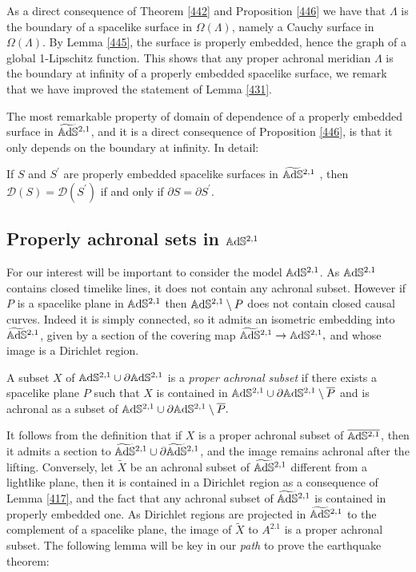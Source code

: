 \begin{observation}\label{447}
    As a direct consequence of Theorem \ref{442} and Proposition \ref{446} we have that $\Lambda$ is the boundary of a spacelike surface in $\Omega(\Lambda)$, namely a Cauchy surface in $\Omega(\Lambda)$. By Lemma \ref{445}, the surface is properly embedded, hence the graph of a global 1-Lipschitz function. This shows that any proper achronal meridian $\Lambda$ is the boundary at infinity of a properly embedded spacelike surface, we remark that we have improved the statement of Lemma \ref{431}.
\end{observation}

The most remarkable property of domain of dependence of a properly embedded surface in $\widetilde{\mathbb{A}\mathrm{d}\mathbb{S}}{}^{2,1}$, and it is a direct consequence of Proposition \ref{446}, is that it only depends on the boundary at infinity. In detail:

\begin{corollary}\label{448}
    If $S$ and $S^{\prime}$ are properly embedded spacelike surfaces in $\widetilde{\mathbb{A}\mathrm{d}\mathbb{S}}{}^{2,1}$ , then $\mathcal{D}(S)=\mathcal{D}(S^{\prime})$ if and only if $\partial S=\partial S^{\prime}$.
\end{corollary}

\subsection{Properly achronal sets in $\mathbb{A}\mathrm{d}\mathbb{S}^{2,1}$}
For our interest will be important to consider the model $\mathbb{A}\mathrm{d}\mathbb{S}^{2,1}$. As $\mathbb{A}\mathrm{d}\mathbb{S}^{2,1}$ contains closed timelike lines, it does not contain any achronal subset. However if $P$ is a spacelike plane in $\mathbb{A}\mathrm{d}\mathbb{S}^{2,1}$ then $\mathbb{A}\mathrm{d}\mathbb{S}^{2,1}\setminus P$ does not contain closed causal curves. Indeed it is simply connected, so it admits an isometric embedding into $\widetilde{\mathbb{A}\mathrm{d}\mathbb{S}}{}^{2,1}$, given by a section of the covering map $\widetilde{\mathbb{A}\mathrm{d}\mathbb{S}}{}^{2,1}\to\mathbb{A}\mathrm{d}\mathbb{S}^{2,1},$ and whose image is a Dirichlet region.
\begin{definition}
    A subset $X$ of $\mathbb{A}\mathrm{d}\mathbb{S}^{2,1}\cup\partial\mathbb{A}\mathrm{d}\mathbb{S}^{2,1}$ is a \textit{proper achronal subset} if there exists a spacelike plane $P$ such that $X$ is contained in $\mathbb{A}\mathrm{d}\mathbb{S}^{2,1}\cup\partial\mathbb{A}\mathrm{d}\mathbb{S}^{2,1}\setminus\overline{P}$ and is achronal as a subset of $\mathbb{A}\mathrm{d}\mathbb{S}^{2,1}\cup\partial\mathbb{A}\mathrm{d}\mathbb{S}^{2,1}\setminus\overline{P}.$  
\end{definition}

It follows from the definition that if $X$ is a proper achronal subset of $\overline{\mathbb{A}\mathrm{d}\mathbb{S}^{2,1}}$, then it admits a section to $\widetilde{\mathbb{A}\mathrm{d}\mathbb{S}}{}^{2,1}\cup\partial\widetilde{\mathbb{A}\mathrm{d}\mathbb{S}}{}^{2,1}$, and the image remains achronal after the lifting. Conversely, let $\tilde{X}$ be an achronal subset of $\widetilde{\mathbb{A}\mathrm{d}\mathbb{S}}{}^{2,1}$ different from a lightlike plane, then it is contained in a Dirichlet region as a consequence of Lemma \ref{417}, and the fact that any achronal subset of $\widetilde{\mathbb{A}\mathrm{d}\mathbb{S}}{}^{2,1}$ is contained in properly embedded one. As Dirichlet regions are projected in $\widetilde{\mathbb{A}\mathrm{d}\mathbb{S}}{}^{2,1}$ to the complement of a spacelike plane, the image of $\tilde{X}$ to $A^{2.1}$ is a proper achronal subset. The following lemma will be key in our \textit{path} to prove the earthquake theorem:\\

